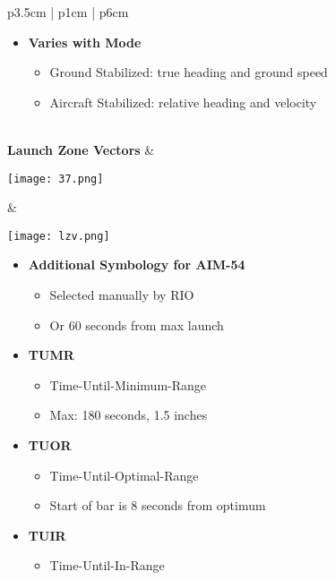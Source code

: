 \documentclass[8pt,usenames,dvipsnames,twoside]{article}
\begin{document}
\begin{center}
\begin{longtable}{p{3.5cm} | p{1cm} |  p{6cm}}
\begin{minipage}[t]{\linewidth}
\begin{itemize}
						\item \textbf{Varies with Mode}
						\begin{itemize}
							\item Ground Stabilized: true heading and ground speed
							\item Aircraft Stabilized: relative heading and velocity
						\end{itemize}
					\end{itemize}
				\end{minipage} \\
				\midrule
				\textbf{Launch Zone Vectors} &
				\begin{minipage}[t]{\linewidth}
					\vspace{-7pt}
					\centering
					\texttt{[image: 37.png]}
				\end{minipage} &  
				\begin{minipage}[t]{\linewidth}
					\vspace{-7pt}
					\centering
					\texttt{[image: lzv.png]}
				\end{minipage}
				\begin{minipage}[t]{\linewidth}
					\begin{itemize}
						\item \textbf{Additional Symbology for AIM-54}
						\begin{itemize}
							\item Selected manually by RIO
							\item Or 60 seconds from max launch
						\end{itemize}
						\item \textbf{TUMR}
						\begin{itemize}
							\item Time-Until-Minimum-Range
							\item Max: 180 seconds, 1.5 inches
						\end{itemize}
						\item \textbf{TUOR}
						\begin{itemize}
							\item Time-Until-Optimal-Range
							\item Start of bar is 8 seconds from optimum
						\end{itemize}
						\item \textbf{TUIR}
						\begin{itemize}
							\item Time-Until-In-Range
						\end{itemize}

\end{itemize}
\end{minipage}
\end{longtable}
\end{center}
\end{document}
